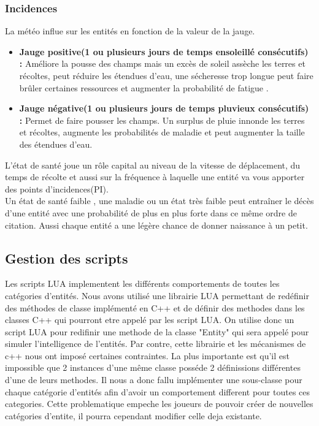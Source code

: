 \documentclass[a4paper]{article}
\newcommand{\alinea}{\hspace*{0.5cm}}
\begin{document}
			\subsubsection{Incidences}

\label{IncidenceE}
\alinea La météo influe sur les entités en fonction de la valeur de la jauge.
\begin{itemize} \small
		\item \textbf{Jauge positive(1 ou plusieurs jours de temps ensoleillé consécutifs) :} Améliore la pousse des champs mais un excès de soleil assèche les terres et récoltes, peut réduire les étendues d'eau, une sécheresse trop longue peut faire brûler certaines ressources et augmenter la probabilité de fatigue .
		\item \textbf{Jauge négative(1 ou plusieurs jours de temps pluvieux consécutifs) :} Permet de faire pousser les champs. Un surplus de pluie innonde les terres et récoltes, augmente les probabilités de maladie et peut augmenter la taille des étendues d'eau.
	  \end{itemize} \normalsize

L'état de santé joue un rôle capital au niveau de la vitesse de déplacement, du temps de récolte et aussi sur la fréquence à laquelle une entité va vous apporter des points d'incidences(PI).\\
	  	  \alinea  Un état de santé faible , une maladie ou un état très faible peut entraîner le décès  d'une entité avec une probabilité de plus en plus forte dans ce même ordre de citation.	  
Aussi chaque entité a une légère chance de donner naissance à un petit.
			
		\subsection{Gestion des scripts}
			Les scripts LUA implementent les différents comportements de toutes les catégories d'entités. Nous avons utilisé une librairie LUA permettant de redéfinir des méthodes de classe implémenté en C++ et de définir des methodes dans les classes C++ qui pourront etre appelé par les script LUA.
			On utilise donc un script LUA pour redifinir une methode de la classe "Entity" qui sera appelé pour simuler l'intelligence de l'entités.
			Par contre, cette librairie et les mécanismes de c++ nous ont imposé certaines contraintes. La plus importante est qu'il est impossible que 2 instances d'une même classe posséde 2 définissions différentes d'une de leurs methodes. Il nous a donc fallu implémenter une sous-classe pour chaque catégorie d'entités afin d'avoir un comportement different pour toutes ces categories. Cette problematique empeche les joueurs de pouvoir créer de nouvelles catégories d'entite, il pourra cependant modifier celle deja existante.
			
\end{document}
